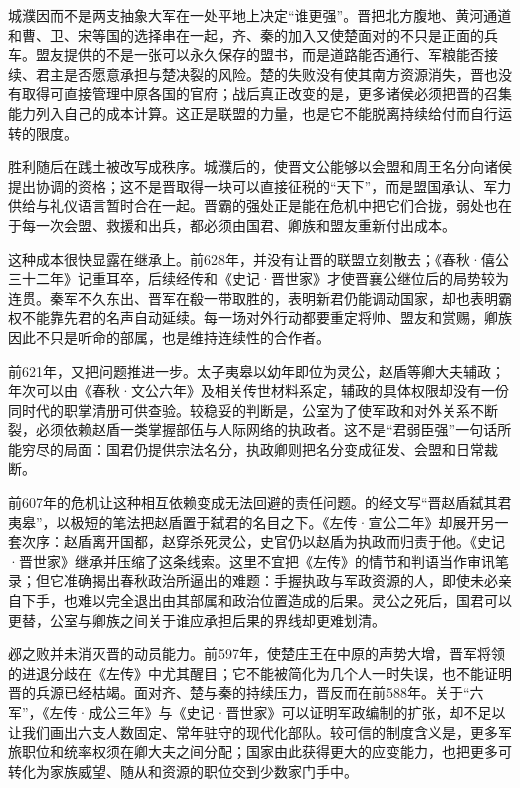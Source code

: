 城濮因而不是两支抽象大军在一处平地上决定“谁更强”。晋把北方腹地、黄河通道和曹、卫、宋等国的选择串在一起，齐、秦的加入又使楚面对的不只是正面的兵车。盟友提供的不是一张可以永久保存的盟书，而是道路能否通行、军粮能否接续、君主是否愿意承担与楚决裂的风险。楚的失败没有使其南方资源消失，晋也没有取得可直接管理中原各国的官府；战后真正改变的是，更多诸侯必须把晋的召集能力列入自己的成本计算。这正是联盟的力量，也是它不能脱离持续给付而自行运转的限度。

胜利随后在践土被改写成秩序。城濮后的，使晋文公能够以会盟和周王名分向诸侯提出协调的资格；这不是晋取得一块可以直接征税的“天下”，而是盟国承认、军力供给与礼仪语言暂时合在一起。晋霸的强处正是能在危机中把它们合拢，弱处也在于每一次会盟、救援和出兵，都必须由国君、卿族和盟友重新付出成本。

这种成本很快显露在继承上。前628年，并没有让晋的联盟立刻散去；《春秋·僖公三十二年》记重耳卒，后续经传和《史记·晋世家》才使晋襄公继位后的局势较为连贯。秦军不久东出、晋军在殽一带取胜的，表明新君仍能调动国家，却也表明霸权不能靠先君的名声自动延续。每一场对外行动都要重定将帅、盟友和赏赐，卿族因此不只是听命的部属，也是维持连续性的合作者。

前621年，又把问题推进一步。太子夷皋以幼年即位为灵公，赵盾等卿大夫辅政；年次可以由《春秋·文公六年》及相关传世材料系定，辅政的具体权限却没有一份同时代的职掌清册可供查验。较稳妥的判断是，公室为了使军政和对外关系不断裂，必须依赖赵盾一类掌握部伍与人际网络的执政者。这不是“君弱臣强”一句话所能穷尽的局面：国君仍提供宗法名分，执政卿则把名分变成征发、会盟和日常裁断。

前607年的危机让这种相互依赖变成无法回避的责任问题。的经文写“晋赵盾弑其君夷皋”，以极短的笔法把赵盾置于弑君的名目之下。《左传·宣公二年》却展开另一套次序：赵盾离开国都，赵穿杀死灵公，史官仍以赵盾为执政而归责于他。《史记·晋世家》继承并压缩了这条线索。这里不宜把《左传》的情节和判语当作审讯笔录；但它准确揭出春秋政治所逼出的难题：手握执政与军政资源的人，即使未必亲自下手，也难以完全退出由其部属和政治位置造成的后果。灵公之死后，国君可以更替，公室与卿族之间关于谁应承担后果的界线却更难划清。

邲之败并未消灭晋的动员能力。前597年，使楚庄王在中原的声势大增，晋军将领的进退分歧在《左传》中尤其醒目；它不能被简化为几个人一时失误，也不能证明晋的兵源已经枯竭。面对齐、楚与秦的持续压力，晋反而在前588年。关于“六军”，《左传·成公三年》与《史记·晋世家》可以证明军政编制的扩张，却不足以让我们画出六支人数固定、常年驻守的现代化部队。较可信的制度含义是，更多军旅职位和统率权须在卿大夫之间分配；国家由此获得更大的应变能力，也把更多可转化为家族威望、随从和资源的职位交到少数家门手中。

